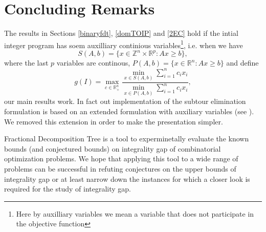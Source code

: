 \section{Concluding Remarks}

The results in Sections \ref{binaryfdt}, \ref{domTOIP} and \ref{2EC} hold if the intial integer program has soem auxilliary continious variables\footnote{Here by auxilliary variables we mean a variable that does not participate in the objective function}, i.e. when we have 
\begin{equation*}
S(A,b) = \{x\in \mathbb{Z}^n\times \mathbb{R}^p: Ax\geq b\},
\end{equation*}
where the last $p$ variables are continous, $P(A,b) = \{x\in \mathbb{R}^n: Ax\geq b\}$ and define
\begin{equation*}
g(I) = \max_{c\in \mathbb{R}^n_+}\frac{\min_{x\in S(A,b)} \sum_{i=1}^{n}c_ix_i}{\min_{x\in P(A,b)} \sum_{i=1}^{n}c_ix_i},
\end{equation*}
our main results work. In fact out implementation of the subtour elimination formulation is based on an extended formulation with auxiliary variables (see \cite{subtour-extended}). We removed this extension in order to make the presentation simpler.

Fractional Decomposition Tree is a tool to experminetally evaluate the known bounds (and conjectured bounds) on integrality gap of combinatorial optimization problems. We hope that applying this tool to a wide range of problems can be successful in refuting conjectures on the upper bounds of integrality gap or at least narrow down the instances for which a closer look is required for the study of integrality gap.